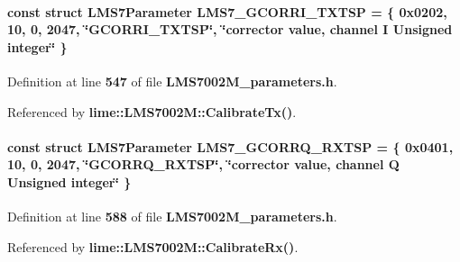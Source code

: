 \paragraph[{L\+M\+S7\+\_\+\+G\+C\+O\+R\+R\+I\+\_\+\+T\+X\+T\+SP}]{\setlength{\rightskip}{0pt plus 5cm}const struct {\bf L\+M\+S7\+Parameter} L\+M\+S7\+\_\+\+G\+C\+O\+R\+R\+I\+\_\+\+T\+X\+T\+SP = \{ 0x0202, 10, 0, 2047, \char`\"{}\+G\+C\+O\+R\+R\+I\+\_\+\+T\+X\+T\+S\+P\char`\"{}, \char`\"{}corrector value, channel I Unsigned integer\char`\"{} \}\hspace{0.3cm}{\ttfamily [static]}}\label{LMS7002M__parameters_8h_ab49cf63214951d208679043e1df797fc}


Definition at line {\bf 547} of file {\bf L\+M\+S7002\+M\+\_\+parameters.\+h}.



Referenced by {\bf lime\+::\+L\+M\+S7002\+M\+::\+Calibrate\+Tx()}.

\paragraph[{L\+M\+S7\+\_\+\+G\+C\+O\+R\+R\+Q\+\_\+\+R\+X\+T\+SP}]{\setlength{\rightskip}{0pt plus 5cm}const struct {\bf L\+M\+S7\+Parameter} L\+M\+S7\+\_\+\+G\+C\+O\+R\+R\+Q\+\_\+\+R\+X\+T\+SP = \{ 0x0401, 10, 0, 2047, \char`\"{}\+G\+C\+O\+R\+R\+Q\+\_\+\+R\+X\+T\+S\+P\char`\"{}, \char`\"{}corrector value, channel Q Unsigned integer\char`\"{} \}\hspace{0.3cm}{\ttfamily [static]}}\label{LMS7002M__parameters_8h_ac0075073ae0965f00a0b84cff1b77fd5}


Definition at line {\bf 588} of file {\bf L\+M\+S7002\+M\+\_\+parameters.\+h}.



Referenced by {\bf lime\+::\+L\+M\+S7002\+M\+::\+Calibrate\+Rx()}.

